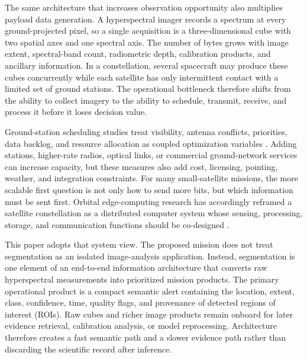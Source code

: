 \documentclass[a4paper,fleqn]{cas-dc}
\begin{document}
The same architecture that increases observation opportunity also multiplies payload data generation. A hyperspectral imager records a spectrum at every ground-projected pixel, so a single acquisition is a three-dimensional cube with two spatial axes and one spectral axis. The number of bytes grows with image extent, spectral-band count, radiometric depth, calibration products, and ancillary information. In a constellation, several spacecraft may produce these cubes concurrently while each satellite has only intermittent contact with a limited set of ground stations. The operational bottleneck therefore shifts from the ability to collect imagery to the ability to schedule, transmit, receive, and process it before it loses decision value. 

Ground-station scheduling studies treat visibility, antenna conflicts, priorities, data backlog, and resource allocation as coupled optimization variables \cite{petelin2023multiobjective}. Adding stations, higher-rate radios, optical links, or commercial ground-network services can increase capacity, but these measures also add cost, licensing, pointing, weather, and integration constraints. For many small-satellite missions, the more scalable first question is not only how to send more bits, but which information must be sent first. Orbital edge-computing research has accordingly reframed a satellite constellation as a distributed computer system whose sensing, processing, storage, and communication functions should be co-designed \cite{denby2020orbital, cheng2025nanosatellite}.

This paper adopts that system view. The proposed mission does not treat segmentation as an isolated image-analysis application. Instead, segmentation is one element of an end-to-end information architecture that converts raw hyperspectral measurements into prioritized mission products. The primary operational product is a compact semantic alert containing the location, extent, class, confidence, time, quality flags, and provenance of detected regions of interest (ROIs). Raw cubes and richer image products remain onboard for later evidence retrieval, calibration analysis, or model reprocessing. Architecture therefore creates a fast semantic path and a slower evidence path rather than discarding the scientific record after inference.
\end{document}
